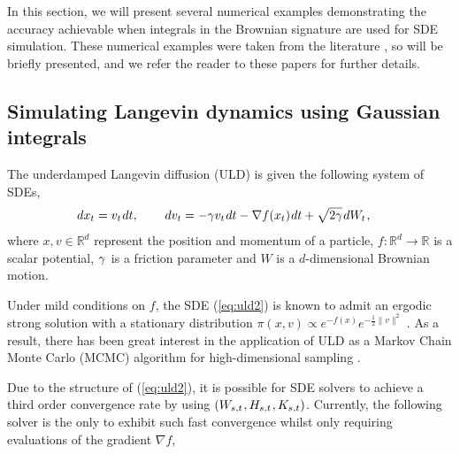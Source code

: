 \documentclass[sn-mathphys-num]{sn-jnl}%
\newcommand{\R}{\mathbb{R}}
\newcommand{\m}{\hspace{0.25mm}}
\begin{document}
In this section, we will present several numerical examples demonstrating the accuracy achievable when integrals in the Brownian signature are used for SDE simulation.
These numerical examples were taken from the literature \cite{foster2024splitting, jelincic2025levygan, foster2020poly, jelincic2024vbt, foster2021uld, foster2024adaptive, tubikanec2022igbm}, so will be briefly presented, and we refer the reader to these papers for further details.

\subsection{Simulating Langevin dynamics using Gaussian integrals}

The underdamped Langevin diffusion (ULD) is given the following system of SDEs,
\begin{align}
dx_t & = v_t\m dt,\hspace{7.5mm} dv_t = -\gamma v_t\m dt - \nabla f(x_t)\m dt + \sqrt{2\gamma}\m dW_t\m,\label{eq:uld2}
\end{align}
where $x, v\in\R^d$ represent the position and momentum of a particle, $f : \R^d\rightarrow \R$ is a scalar potential, $\gamma\m$ is a friction parameter and $W$ is a $d$-dimensional Brownian motion.\medbreak

Under mild conditions on $f$, the SDE (\ref{eq:uld2}) is known to admit an ergodic strong solution with a stationary distribution $\pi(x,v)\propto e^{-f(x)} e^{-\frac{1}{2}\|v\|^2}$  \cite[Proposition 6.1]{pavliotis2014spa}.
As a result, there has been great interest in the application of ULD as a Markov Chain Monte Carlo (MCMC) algorithm for high-dimensional sampling \cite{cheng2018uld, chen2014sghmc, chada2024uld, dalalyan2020uld, rioudurand2023malt, scott2025uld}.\medbreak

Due to the structure of (\ref{eq:uld2}), it is possible for SDE solvers to achieve a third order convergence rate by using $(W_{s,t}\m, H_{s,t}\m, K_{s,t})$. Currently, the following solver is the only to exhibit such fast convergence whilst only requiring evaluations of the gradient $\nabla f$,\medbreak
\end{document}
